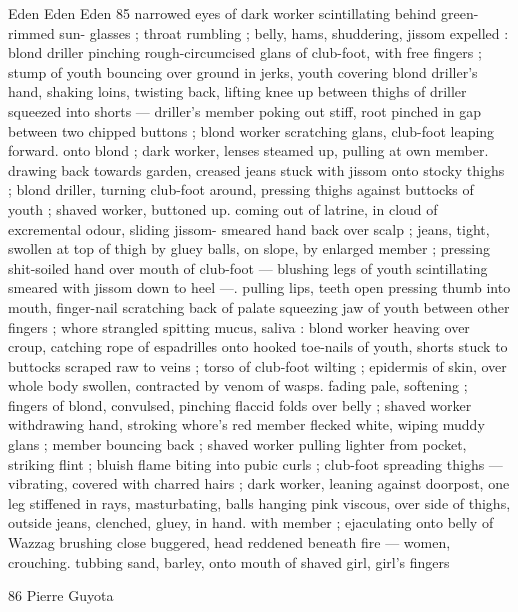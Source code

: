Eden Eden Eden 85
narrowed eyes of dark worker scintillating behind green-rimmed sun-
glasses ; throat rumbling ; belly, hams, shuddering, jissom expelled :
blond driller pinching rough-circumcised glans of club-foot, with free
fingers ; stump of youth bouncing over ground in jerks, youth
covering blond driller’s hand, shaking loins, twisting back, lifting
knee up between thighs of driller squeezed into shorts — driller's
member poking out stiff, root pinched in gap between two chipped
buttons ; blond worker scratching glans, club-foot leaping forward.
onto blond ; dark worker, lenses steamed up, pulling at own member.
drawing back towards garden, creased jeans stuck with jissom onto
stocky thighs ; blond driller, turning club-foot around, pressing
thighs against buttocks of youth ; shaved worker, buttoned up.
coming out of latrine, in cloud of excremental odour, sliding jissom-
smeared hand back over scalp ; jeans, tight, swollen at top of thigh
by gluey balls, on slope, by enlarged member ; pressing shit-soiled
hand over mouth of club-foot — blushing legs of youth scintillating
smeared with jissom down to heel —. pulling lips, teeth open
pressing thumb into mouth, finger-nail scratching back of palate
squeezing jaw of youth between other fingers ; whore strangled
spitting mucus, saliva : blond worker heaving over croup, catching
rope of espadrilles onto hooked toe-nails of youth, shorts stuck to
buttocks scraped raw to veins ; torso of club-foot wilting ; epidermis
of skin, over whole body swollen, contracted by venom of wasps.
fading pale, softening ; fingers of blond, convulsed, pinching flaccid
folds over belly ; shaved worker withdrawing hand, stroking whore's
red member flecked white, wiping muddy glans ; member bouncing
back ; shaved worker pulling lighter from pocket, striking flint ; bluish
flame biting into pubic curls ; club-foot spreading thighs —
vibrating, covered with charred hairs ; dark worker, leaning against
doorpost, one leg stiffened in rays, masturbating, balls hanging pink
viscous, over side of thighs, outside jeans, clenched, gluey, in hand.
with member ; ejaculating onto belly of Wazzag brushing close
buggered, head reddened beneath fire — women, crouching.
tubbing sand, barley, onto mouth of shaved girl, girl's fingers

86 Pierre Guyota

